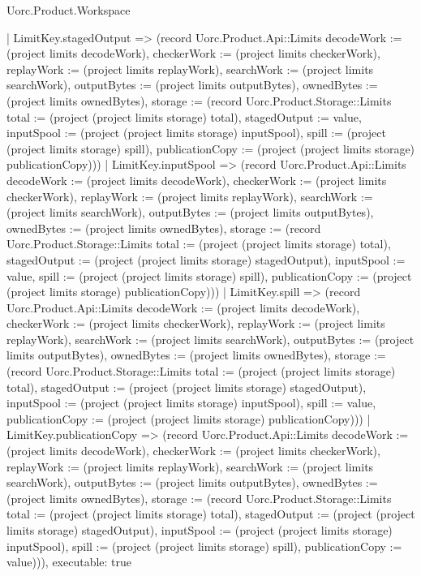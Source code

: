 \begin{lexlean}{Uorc.Product.Workspace}
\begin{semanticmodule}
{    | LimitKey.stagedOutput => (record Uorc.Product.Api::Limits {decodeWork := (project limits decodeWork), checkerWork := (project limits checkerWork), replayWork := (project limits replayWork), searchWork := (project limits searchWork), outputBytes := (project limits outputBytes), ownedBytes := (project limits ownedBytes), storage := (record Uorc.Product.Storage::Limits {total := (project (project limits storage) total), stagedOutput := value, inputSpool := (project (project limits storage) inputSpool), spill := (project (project limits storage) spill), publicationCopy := (project (project limits storage) publicationCopy)})})
    | LimitKey.inputSpool => (record Uorc.Product.Api::Limits {decodeWork := (project limits decodeWork), checkerWork := (project limits checkerWork), replayWork := (project limits replayWork), searchWork := (project limits searchWork), outputBytes := (project limits outputBytes), ownedBytes := (project limits ownedBytes), storage := (record Uorc.Product.Storage::Limits {total := (project (project limits storage) total), stagedOutput := (project (project limits storage) stagedOutput), inputSpool := value, spill := (project (project limits storage) spill), publicationCopy := (project (project limits storage) publicationCopy)})})
    | LimitKey.spill => (record Uorc.Product.Api::Limits {decodeWork := (project limits decodeWork), checkerWork := (project limits checkerWork), replayWork := (project limits replayWork), searchWork := (project limits searchWork), outputBytes := (project limits outputBytes), ownedBytes := (project limits ownedBytes), storage := (record Uorc.Product.Storage::Limits {total := (project (project limits storage) total), stagedOutput := (project (project limits storage) stagedOutput), inputSpool := (project (project limits storage) inputSpool), spill := value, publicationCopy := (project (project limits storage) publicationCopy)})})
    | LimitKey.publicationCopy => (record Uorc.Product.Api::Limits {decodeWork := (project limits decodeWork), checkerWork := (project limits checkerWork), replayWork := (project limits replayWork), searchWork := (project limits searchWork), outputBytes := (project limits outputBytes), ownedBytes := (project limits ownedBytes), storage := (record Uorc.Product.Storage::Limits {total := (project (project limits storage) total), stagedOutput := (project (project limits storage) stagedOutput), inputSpool := (project (project limits storage) inputSpool), spill := (project (project limits storage) spill), publicationCopy := value})})),
  executable: true
}


\end{semanticmodule}
\end{lexlean}
